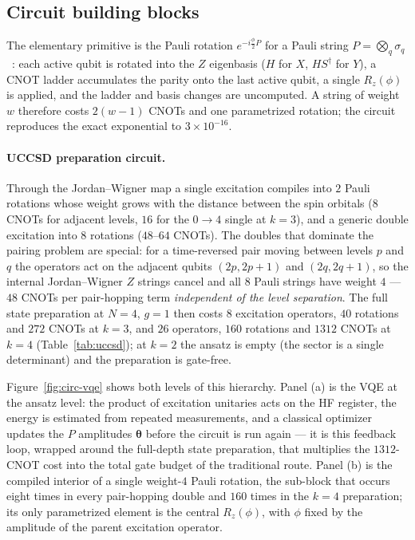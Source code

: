 \documentclass[
  aps,            %
  prc,            %
  reprint,        %
  superscriptaddress,
  floatfix,
  nofootinbib
]{revtex4-2}
\begin{document}
\subsection{Circuit building blocks}
\label{sec:blocks}
The elementary primitive is the Pauli rotation $e^{-i\frac{\phi}{2}P}$ for a
Pauli string $P=\bigotimes_q\sigma_q$~\cite{NielsenChuang}: each active qubit is rotated into the $Z$
eigenbasis ($H$ for $X$, $HS^\dagger$ for $Y$), a CNOT ladder accumulates the
parity onto the last active qubit, a single $R_z(\phi)$ is applied, and the
ladder and basis changes are uncomputed.  A string of weight $w$ therefore costs
$2(w-1)$ CNOTs and one parametrized rotation; the circuit reproduces the exact
exponential to $3\times10^{-16}$.

\paragraph{UCCSD preparation circuit.}
Through the Jordan--Wigner map a single excitation compiles into $2$ Pauli
rotations whose weight grows with the distance between the spin orbitals
($8$ CNOTs for adjacent levels, $16$ for the $0\!\to\!4$ single at $k=3$), and a
generic double excitation into $8$ rotations ($48$--$64$ CNOTs).  The doubles
that dominate the pairing problem are special: for a time-reversed pair moving
between levels $p$ and $q$ the operators act on the adjacent qubits
$(2p,2p{+}1)$ and $(2q,2q{+}1)$, so the internal Jordan--Wigner $Z$ strings
cancel and all $8$ Pauli strings have weight $4$ --- $48$ CNOTs per pair-hopping
term \emph{independent of the level separation}.  The full state preparation at
$N=4$, $g=1$ then costs $8$ excitation operators, $40$ rotations and $272$ CNOTs
at $k=3$, and $26$ operators, $160$ rotations and $1312$ CNOTs at $k=4$
(Table~\ref{tab:uccsd}); at $k=2$ the ansatz is empty (the sector is a single
determinant) and the preparation is gate-free.

Figure~\ref{fig:circ-vqe} shows both levels of this hierarchy.  Panel (a) is
the VQE at the ansatz level: the product of excitation unitaries acts on the HF
register, the energy is estimated from repeated measurements, and a classical
optimizer updates the $P$ amplitudes $\boldsymbol\theta$ before the circuit is
run again --- it is this feedback loop, wrapped around the full-depth state
preparation, that multiplies the $1312$-CNOT cost into the total gate budget of
the traditional route.  Panel (b) is the compiled interior of a single
weight-$4$ Pauli rotation, the sub-block that occurs eight times in every
pair-hopping double and $160$ times in the $k=4$ preparation; its only
parametrized element is the central $R_z(\phi)$, with $\phi$ fixed by the
amplitude of the parent excitation operator.
\end{document}

